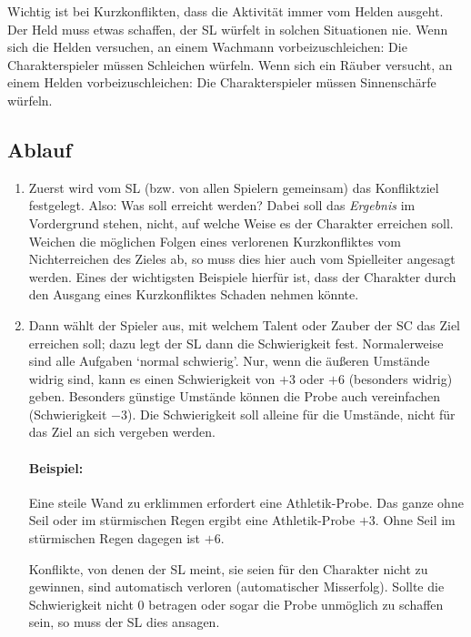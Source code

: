 Wichtig ist bei Kurzkonflikten, dass die Aktivität immer vom Helden ausgeht. Der Held muss etwas schaffen, der SL würfelt in solchen Situationen nie. Wenn sich die Helden versuchen, an einem Wachmann vorbeizuschleichen: Die Charakterspieler müssen Schleichen würfeln. Wenn sich ein Räuber versucht, an einem Helden vorbeizuschleichen: Die Charakterspieler müssen Sinnenschärfe würfeln.


\subsection{Ablauf}\label{KurzkonfliktAblauf}

\begin{enumerate}
  \item Zuerst wird vom SL (bzw. von allen Spielern gemeinsam) das Konfliktziel festgelegt. Also: Was soll erreicht werden? Dabei soll das \emph{Ergebnis} im Vordergrund stehen, nicht, auf welche Weise es der Charakter erreichen soll. Weichen die möglichen Folgen eines verlorenen Kurzkonfliktes vom Nichterreichen des Zieles ab, so muss dies hier auch vom Spielleiter angesagt werden. Eines der wichtigsten Beispiele hierfür ist, dass der Charakter durch den Ausgang eines Kurzkonfliktes Schaden nehmen könnte.

  \item Dann wählt der Spieler aus, mit welchem Talent oder Zauber der SC das Ziel erreichen soll; dazu legt der SL dann die Schwierigkeit fest. Normalerweise sind alle Aufgaben `normal schwierig'. Nur, wenn die äußeren Umstände widrig sind, kann es einen Schwierigkeit von $+3$ oder $+6$ (besonders widrig) geben. Besonders günstige Umstände können die Probe auch vereinfachen (Schwierigkeit $-3$). Die Schwierigkeit soll alleine für die Umstände, nicht für das Ziel an sich vergeben werden.

  \begin{beispiel}
    \paragraph{Beispiel:} Eine steile Wand zu erklimmen erfordert eine Athletik-Probe. Das ganze ohne Seil oder im stürmischen Regen ergibt eine Athletik-Probe $+3$. Ohne Seil im stürmischen Regen dagegen ist $+6$.
  \end{beispiel}

  Konflikte, von denen der SL meint, sie seien für den Charakter nicht zu gewinnen, sind automatisch verloren (automatischer Misserfolg). Sollte die Schwierigkeit nicht $0$ betragen oder sogar die Probe unmöglich zu schaffen sein, so muss der SL dies ansagen.


\end{enumerate}
